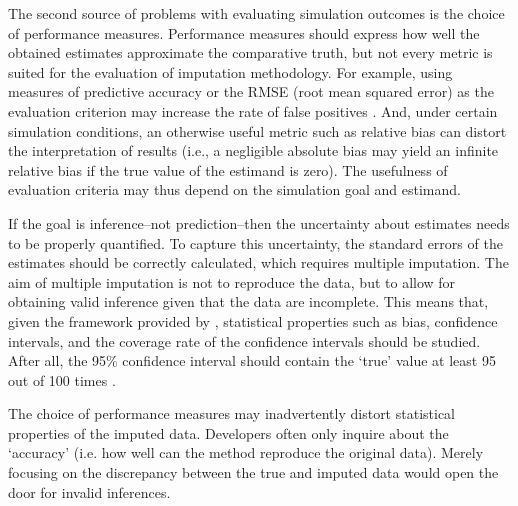 \documentclass[bimj,fleqn]{w-art}
\begin{document}
The second source of problems with evaluating simulation outcomes is the choice of performance measures. Performance measures should express how well the obtained estimates approximate the comparative truth, but not every metric is suited for the evaluation of imputation methodology. For example, using measures of predictive accuracy or the RMSE (root mean squared error) as the evaluation criterion may increase the rate of false positives \citep[][\S 2.6]{buur18}. And, under certain simulation conditions, an otherwise useful metric such as relative bias can distort the interpretation of results (i.e., a negligible absolute bias may yield an infinite relative bias if the true value of the estimand is zero). The usefulness of evaluation criteria may thus depend on the simulation goal and estimand.

If the goal is inference--not prediction--then the uncertainty about estimates needs to be properly quantified. To capture this uncertainty, the standard errors of the estimates should be correctly calculated, which requires multiple imputation. The aim of multiple imputation is not to reproduce the data, but to allow for obtaining valid inference given that the data are incomplete. This means that, given the framework provided by \citet{rubi87}, statistical properties such as bias, confidence intervals, and the coverage rate of the confidence intervals should be studied. After all, the 95\% confidence interval should contain the `true' value at least 95 out of 100 times \citep[][p. 591]{neym34}. 

The choice of performance measures may inadvertently distort statistical properties of the imputed data. Developers often only inquire about the `accuracy' (i.e. how well can the method reproduce the original data). Merely focusing on the discrepancy between the true and imputed data would open the door for invalid inferences. 



\end{document}
